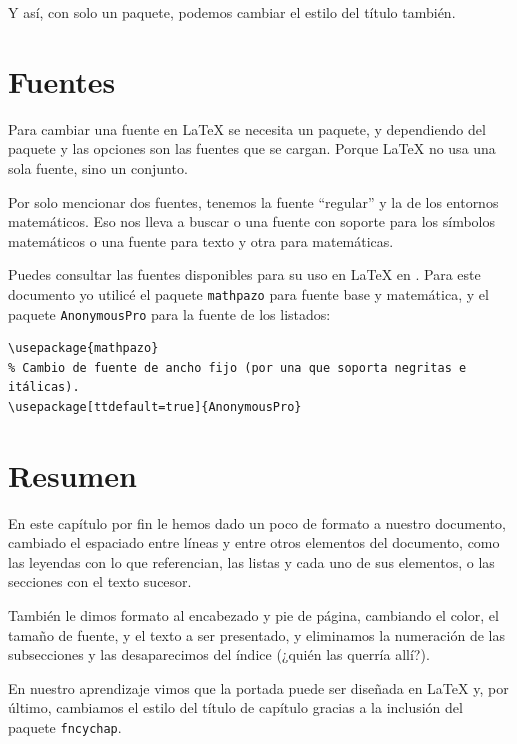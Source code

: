Y así, con solo un paquete, podemos cambiar el estilo del título también.



\section{Fuentes}
\label{sec:fuentes}



Para cambiar una fuente en \LaTeX{} se necesita un paquete, y dependiendo del paquete y las opciones son las fuentes que se cargan. Porque \LaTeX{} no usa una sola fuente, sino un conjunto.

Por solo mencionar dos fuentes, tenemos la fuente ``regular'' y la de los entornos matemáticos. Eso nos lleva a buscar o una fuente con soporte para los símbolos matemáticos o una fuente para texto y otra para matemáticas.

Puedes consultar las fuentes disponibles para su uso en \LaTeX{} en \cite{bib:catalogo_fuentes}. Para este documento yo utilicé el paquete \texttt{mathpazo} para fuente base y matemática, y el paquete \texttt{AnonymousPro} para la fuente de los listados:

\begin{lstlisting}[style=latex]
% Cambio de fuente base y matemática.
\usepackage{mathpazo}
% Cambio de fuente de ancho fijo (por una que soporta negritas e itálicas).
\usepackage[ttdefault=true]{AnonymousPro}
\end{lstlisting}



\section*{Resumen}



En este capítulo por fin le hemos dado un poco de formato a nuestro documento, cambiado el espaciado entre líneas y entre otros elementos del documento, como las leyendas con lo que referencian, las listas y cada uno de sus elementos, o las secciones con el texto sucesor.

También le dimos formato al encabezado y pie de página, cambiando el color, el tamaño de fuente, y el texto a ser presentado, y eliminamos la numeración de las subsecciones y las desaparecimos del índice (¿quién las querría allí?).

En nuestro aprendizaje vimos que la portada puede ser diseñada en \LaTeX{} y, por último, cambiamos el estilo del título de capítulo gracias a la inclusión del paquete \texttt{fncychap}.